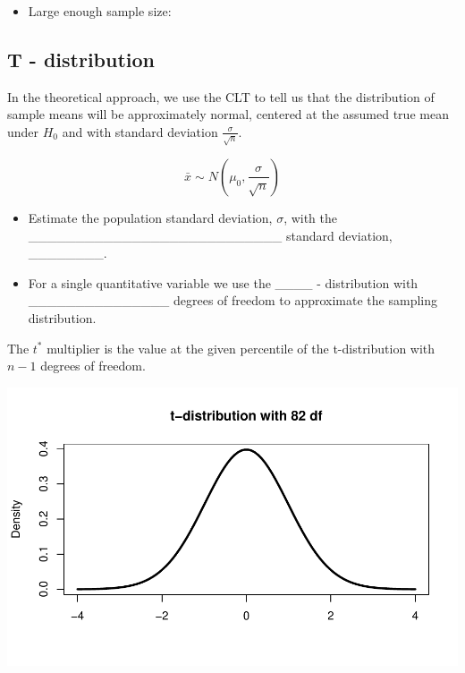 \documentclass[
]{report}
\providecommand{\tightlist}{%
  \setlength{\itemsep}{0pt}\setlength{\parskip}{0pt}}
\begin{document}
\vspace{0.2in}

\begin{itemize}
\tightlist
\item
  Large enough sample size:
\end{itemize}

\vspace{0.2in}

\subsection*{T - distribution}\label{t---distribution-1}

In the theoretical approach, we use the CLT to tell us that the distribution of sample means will be approximately normal, centered at the assumed true mean under \(H_0\) and with standard deviation \(\frac{\sigma}{\sqrt{n}}\).

\[\bar{x} \sim N(\mu_0, \frac{\sigma}{\sqrt{n}})\]

\begin{itemize}
\item
  Estimate the population standard deviation, \(\sigma\), with the
  \_\_\_\_\_\_\_\_\_\_\_\_\_\_\_\_\_\_\_\_\_\_\_\_\_\_\_ standard deviation, \_\_\_\_\_\_\_\_.
\item
  For a single quantitative variable we use the \_\_\_\_ - distribution
  with \_\_\_\_\_\_\_\_\_\_\_\_\_\_\_
  degrees of freedom to approximate the sampling distribution.
\end{itemize}


The \(t^*\) multiplier is the value at the given percentile of the t-distribution with \(n - 1\) degrees of freedom.

\begin{center}\includegraphics[width=0.7\linewidth]{07-VN07-one_meantheory_files/figure-latex/tstarpb-1} \end{center}
\end{document}
